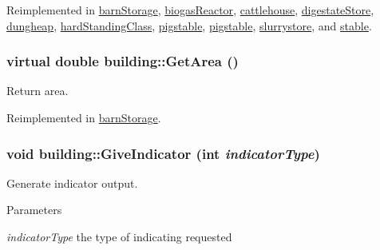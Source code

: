 Reimplemented in \hyperlink{classbarn_storage_ac98e6005a3cb00a07d128931d2a6feb1}{barnStorage}, \hyperlink{classbiogas_reactor_ae8242ee2ab7dd6495125af9720b54aa4}{biogasReactor}, \hyperlink{classcattlehouse_a75cd328a6b1b07b2eb49be0048ac889d}{cattlehouse}, \hyperlink{classdigestate_store_a209611f25ea14ad07c9de42fa46eea05}{digestateStore}, \hyperlink{classdungheap_ab901a0eba5e5cb9164042bbfad350435}{dungheap}, \hyperlink{classhard_standing_class_ac182354be245579d4b8ec936add0c0be}{hardStandingClass}, \hyperlink{classpigstable_a971c427391124e56a4374ace16c461df}{pigstable}, \hyperlink{classpigstable_a0339646d96e17f62b6e745be279ec633}{pigstable}, \hyperlink{classslurrystore_a0e660eb43b403bef8aaefb8188a73d4f}{slurrystore}, and \hyperlink{classstable_a8bdbc59976ddb6c324e7b629794ff388}{stable}.\hypertarget{classbuilding_a930bf40915b04b091ce5fa00cf15c58e}{
\subsubsection[{GetArea}]{\setlength{\rightskip}{0pt plus 5cm}virtual double building::GetArea ()}}
\label{classbuilding_a930bf40915b04b091ce5fa00cf15c58e}


Return area. 

Reimplemented in \hyperlink{classbarn_storage_a727f13788856da203570834247a7b475}{barnStorage}.\hypertarget{classbuilding_ae0e21d6fc26978c65a980676ddf4fcdf}{
\subsubsection[{GiveIndicator}]{\setlength{\rightskip}{0pt plus 5cm}void building::GiveIndicator (int {\em indicatorType})}}
\label{classbuilding_ae0e21d6fc26978c65a980676ddf4fcdf}


Generate indicator output. 
\begin{DoxyParams}{Parameters}
\item[{\em indicatorType}]the type of indicating requested \end{DoxyParams}


